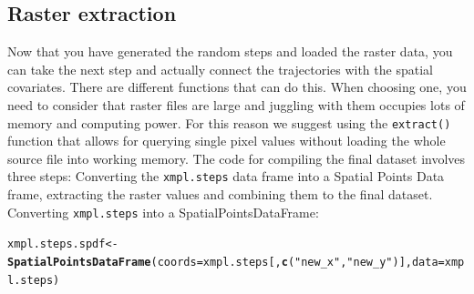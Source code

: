 \documentclass[11pt, a4paper]{article}\usepackage[]{graphicx}\usepackage[]{color}
\makeatletter
\newcommand{\hlstr}[1]{\textcolor[rgb]{0.192,0.494,0.8}{#1}}%
\newcommand{\hlstd}[1]{\textcolor[rgb]{0.345,0.345,0.345}{#1}}%
\newcommand{\hlkwb}[1]{\textcolor[rgb]{0.69,0.353,0.396}{#1}}%
\newcommand{\hlkwc}[1]{\textcolor[rgb]{0.333,0.667,0.333}{#1}}%
\newcommand{\hlkwd}[1]{\textcolor[rgb]{0.737,0.353,0.396}{\textbf{#1}}}%
\newenvironment{kframe}{%
 \def\at@end@of@kframe{}%
 \ifinner\ifhmode%
  \def\at@end@of@kframe{\end{minipage}}%
  \begin{minipage}{\columnwidth}%
 \fi\fi%
 \def\FrameCommand##1{\hskip\@totalleftmargin \hskip-\fboxsep
 \colorbox{shadecolor}{##1}\hskip-\fboxsep
     \hskip-\linewidth \hskip-\@totalleftmargin \hskip\columnwidth}%
 \MakeFramed {\advance\hsize-\width
   \@totalleftmargin\z@ \linewidth\hsize
   \@setminipage}}%
 {\par\unskip\endMakeFramed%
 \at@end@of@kframe}
\newenvironment{knitrout}{}{} %
\makeatother
\begin{document}
\subsection{Raster extraction}
Now that you have generated the random steps and loaded the raster data, you can take the next step and actually connect the trajectories with the spatial covariates. There are different functions that can do this. When choosing one, you need to consider that raster files are large and juggling with them occupies lots of memory and computing power. For this reason we suggest using the \texttt{extract()} function that allows for querying single pixel values without loading the whole source file into working memory. The code for compiling the final dataset involves three steps: Converting the \texttt{xmpl.steps} data frame into a Spatial Points Data frame, extracting the raster values and combining them to the final dataset.
Converting \texttt{xmpl.steps} into a SpatialPointsDataFrame:
\begin{knitrout}
\color{fgcolor}\begin{kframe}
\begin{alltt}
\hlstd{xmpl.steps.spdf} \hlkwb{<-} \hlkwd{SpatialPointsDataFrame}\hlstd{(}\hlkwc{coords} \hlstd{= xmpl.steps[,}\hlkwd{c}\hlstd{(}\hlstr{"new_x"}\hlstd{,}\hlstr{"new_y"}\hlstd{)],} \hlkwc{data} \hlstd{= xmpl.steps)}
\end{alltt}
\end{kframe}
\end{knitrout}
\end{document}
